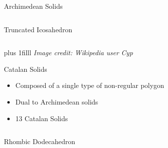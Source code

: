 \documentclass{beamer}
\newcommand{\btVFill}{\vskip0pt plus 1filll}
\begin{document}
\begin{frame}{Archimedean Solids}
\begin{columns}
\begin{column}{0.32\textwidth}
      Truncated Icosahedron
     \end{column}
\end{columns}
\btVFill
\textit{\scriptsize Image credit: Wikipedia user Cyp}
\end{frame}
\begin{frame}{Catalan Solids}
\begin{itemize}
  \item Composed of a single type of non-regular polygon
  \item Dual to Archimedean solids
  \item 13 Catalan Solids
\end{itemize}
\vspace{0.1 in}
\begin{columns}
    \begin{column}{0.32\textwidth}
      \centering


      Rhombic Dodecahedron
     \end{column}
    \begin{column}{0.32\textwidth}
      \centering
      

\end{column}
\end{columns}
\end{frame}
\end{document}
